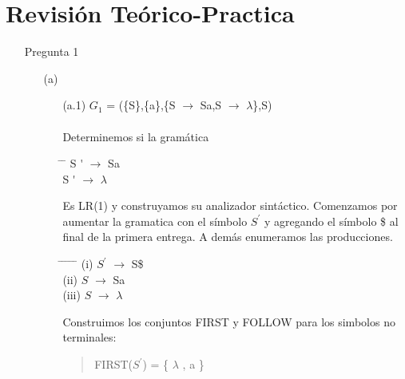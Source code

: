 \documentclass{article}
\begin{document}
		\section{Revisi\'on Te\'orico-Practica}
			\begin{enumerate}
				\large \bf \item[] Pregunta 1
				\normalsize \mdseries
					\begin{enumerate}
					\item[(a)] \
						\begin{enumerate}
							\item[(a.1)] 
								$G_{1}$ = (\{S\},\{a\},\{S $\longrightarrow$ Sa,S $\longrightarrow$ $\lambda$\},S)\\
								\\
								Determinemos si la gram\'atica\\
								\begin{tabbing}
								\hspace*{2cm} \= \hspace*{0.6cm} \= \hspace*{3cm} \kill
									\>S \' $\longrightarrow$\> Sa\\
									\>S \' $\longrightarrow$\> $\lambda$\\
								\end{tabbing}
								Es LR(1) y construyamos su analizador sint\'actico. 
								Comenzamos por aumentar la gramatica con el s\'imbolo $S^{\prime}$ y agregando el s\'imbolo \$ al final de la primera entrega. A dem\'as enumeramos las producciones.
								\begin{tabbing}
								\hspace*{1cm} \= \hspace*{1cm} \= \hspace*{1cm} \= \hspace*{0.6cm} \= \hspace*{0.6cm} \= \hspace*{3cm} \kill
									\> (i)\>  $S^{\prime}$	\> $\longrightarrow$\> 	S\$ 	\\
									\> (ii)\>  $S$	\> $\longrightarrow$\> 	Sa 	\\
									\> (iii)\>  $S$	\> $\longrightarrow$\>  $\lambda$ 	\\
								\end{tabbing}
								Construimos los conjuntos FIRST y FOLLOW para los simbolos no terminales:
								\begin{quotation}
									FIRST($S^{\prime}$) = \{ $\lambda$ , a \}

\end{quotation}
\end{enumerate}
\end{enumerate}
\end{enumerate}
\end{document}
